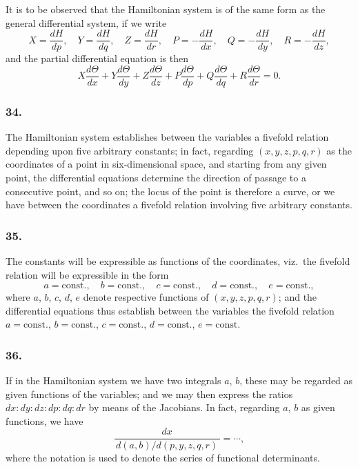 \documentclass[11pt,a4paper]{book}
\begin{document}
It is to be observed that the Hamiltonian system is of the same form as the general differential system, if we write
\[
X = \frac{dH}{dp}, \quad Y = \frac{dH}{dq}, \quad Z = \frac{dH}{dr}, \quad
P = -\frac{dH}{dx}, \quad Q = -\frac{dH}{dy}, \quad R = -\frac{dH}{dz},
\]
and the partial differential equation is then
\[
X\frac{d\Theta}{dx} + Y\frac{d\Theta}{dy} + Z\frac{d\Theta}{dz} + P\frac{d\Theta}{dp} + Q\frac{d\Theta}{dq} + R\frac{d\Theta}{dr} = 0.
\]

\subsubsection*{34.}

The Hamiltonian system establishes between the variables a fivefold relation depending upon five arbitrary constants; in fact, regarding $(x, y, z, p, q, r)$ as the coordinates of a point in six-dimensional space, and starting from any given point, the differential equations determine the direction of passage to a consecutive point, and so on; the locus of the point is therefore a curve, or we have between the coordinates a fivefold relation involving five arbitrary constants.

\subsubsection*{35.}

The constants will be expressible as functions of the coordinates, viz.~the fivefold relation will be expressible in the form
\[
a = \text{const.}, \quad b = \text{const.}, \quad c = \text{const.}, \quad d = \text{const.}, \quad e = \text{const.},
\]
where $a$, $b$, $c$, $d$, $e$ denote respective functions of $(x, y, z, p, q, r)$; and the differential equations thus establish between the variables the fivefold relation $a = \text{const.}$, $b = \text{const.}$, $c = \text{const.}$, $d = \text{const.}$, $e = \text{const.}$

\subsubsection*{36.}

If in the Hamiltonian system we have two integrals $a$, $b$, these may be regarded as given functions of the variables; and we may then express the ratios $dx : dy : dz : dp : dq : dr$ by means of the Jacobians. In fact, regarding $a$, $b$ as given functions, we have
\[
\frac{dx}{\,d(a, b)/d(p, y, z, q, r)\,} = \cdots,
\]
where the notation is used to denote the series of functional determinants.
\end{document}
